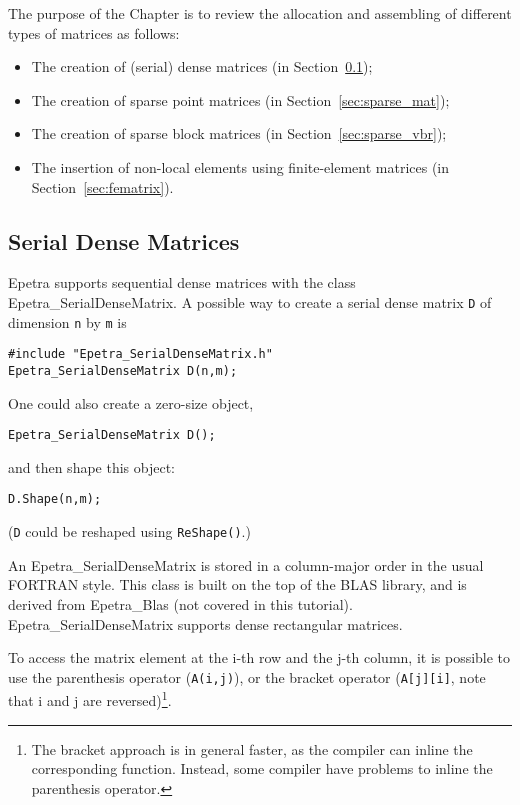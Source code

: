 The purpose of the Chapter is to review the allocation and assembling of
different types of matrices as follows:
\begin{itemize}
\item The creation of (serial) dense matrices (in Section~\ref{sec:dense_mat});
\item The creation of sparse point matrices (in Section~\ref{sec:sparse_mat});
\item The creation of sparse block matrices (in Section~\ref{sec:sparse_vbr});
\item The insertion of non-local elements using finite-element matrices
  (in Section~\ref{sec:fematrix}).
\end{itemize}


\subsection{Serial Dense Matrices}
\label{sec:dense_mat}

Epetra supports sequential dense matrices with the class
Epetra\_SerialDenseMatrix.  A possible way to create a serial dense
matrix \verb!D! of dimension \verb!n!  by \verb!m! is
\begin{verbatim}
#include "Epetra_SerialDenseMatrix.h"
Epetra_SerialDenseMatrix D(n,m);
\end{verbatim}
One could also create a zero-size object, 
\begin{verbatim}
Epetra_SerialDenseMatrix D();
\end{verbatim}
and then shape this object:
\begin{verbatim}
D.Shape(n,m);
\end{verbatim}
({\tt D} could be reshaped using \verb!ReShape()!.)

An Epetra\_SerialDenseMatrix is stored in a column-major order in the
usual FORTRAN style. This class is built on the top of the BLAS library,
and is derived from Epetra\_Blas (not covered in this tutorial).
Epetra\_SerialDenseMatrix supports dense rectangular matrices.

\smallskip

To access the matrix element at the i-th row and the j-th column, it is
possible to use the parenthesis operator (\verb!A(i,j)!), or the bracket
operator (\verb!A[j][i]!, note that i and j are reversed)\footnote{The
  bracket approach is in general faster, as the compiler can inline the
  corresponding function. Instead, some compiler have problems to inline
  the parenthesis operator.}.

